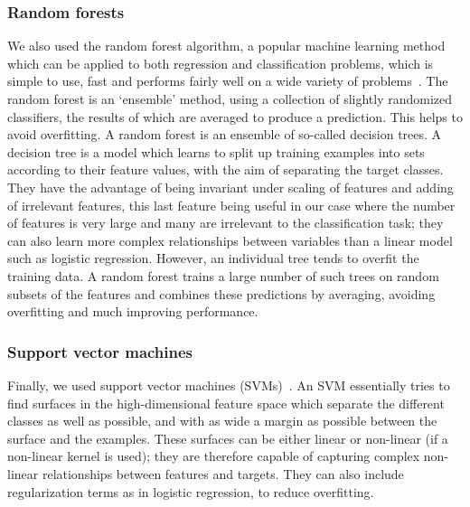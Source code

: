 \documentclass[10pt,letterpaper]{article}
\begin{document}
\subsubsection*{Random forests}
We also used the random forest algorithm, a popular machine learning method which can be applied to both regression and classification problems, which is simple to use, fast and performs fairly well on a wide variety of problems~\cite{Hastie2009}. The random forest is an `ensemble' method, using a collection of slightly randomized classifiers, the results of which are averaged to produce a prediction. This helps to avoid overfitting. A random forest is an ensemble of so-called decision trees. A decision tree is a model which learns to split up training examples into sets according to their feature values, with the aim of separating the target classes. They have the advantage of being invariant under scaling of features and adding of irrelevant features, this last feature being useful in our case where the number of features is very large and many are irrelevant to the classification task; they can also learn more complex relationships between variables than a linear model such as logistic regression. However, an individual tree tends to overfit the training data. A random forest trains a large number of such trees on random subsets of the features and combines these predictions by averaging, avoiding overfitting and much improving performance. 

\subsubsection*{Support vector machines}
Finally, we used support vector machines (SVMs)~\cite{Hastie2009a}. An SVM essentially tries to find surfaces in the high-dimensional feature space which separate the different classes as well as possible, and with as wide a margin as possible between the surface and the examples. These surfaces can be either linear or non-linear (if a non-linear kernel is used); they are therefore capable of capturing complex non-linear relationships between features and targets. They can also include regularization terms as in logistic regression, to reduce overfitting. 
\end{document}
